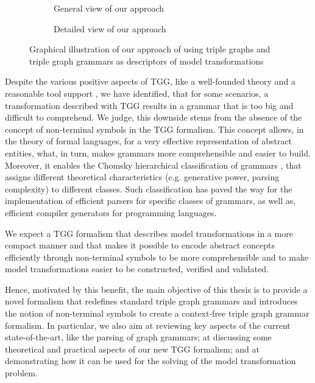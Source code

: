 \begin{figure}
	\begin{subfigure}[t]{0.5\textwidth}
		
		\caption{General view of our approach}
		\label{fig:general-approach-scheme}
	\end{subfigure}
	\begin{subfigure}[t]{0.5\textwidth}
		
		\caption{Detailed view of our approach}
		\label{fig:detailed-approach-scheme}
	\end{subfigure}
	\caption{Graphical illustration of our approach of using triple graphs and triple graph grammars as descriptors of model transformations}
\end{figure}

Despite the various positive aspects of TGG, like a well-founded theory and a reasonable tool support \cite{anjorin201620}, we have identified, that for some scenarios, a transformation described with TGG results in a grammar that is too big and difficult to comprehend. We judge, this downside stems from the absence of the concept of non-terminal symbols in the TGG formalism. This concept allows, in the theory of formal languages, for a very effective representation of abstract entities, what, in turn, makes grammars more comprehensible and easier to build. Moreover, it enables the Chomsky hierarchical classification of grammars \cite{chomsky1959}, that assigns different theoretical characteristics (e.g. generative power, parsing complexity) to different classes. Such classification has paved the way for the implementation of efficient parsers for specific classes of grammars, as well as, efficient compiler generators for programming languages.

We expect a TGG formalism that describes model transformations in a more compact manner and that makes it possible to encode abstract concepts efficiently through non-terminal symbols to be more comprehensible and to make model transformations easier to be constructed, verified and validated.

Hence, motivated by this benefit, the main objective of this thesis is to provide a novel formalism that redefines standard triple graph grammars and introduces the notion of non-terminal symbols to create a context-free triple graph grammar formalism. In particular, we also aim at reviewing key aspects of the current state-of-the-art, like the parsing of graph grammars; at discussing some theoretical and practical aspects of our new TGG formalism; and at demonstrating how it can be used for the solving of the model transformation problem.

